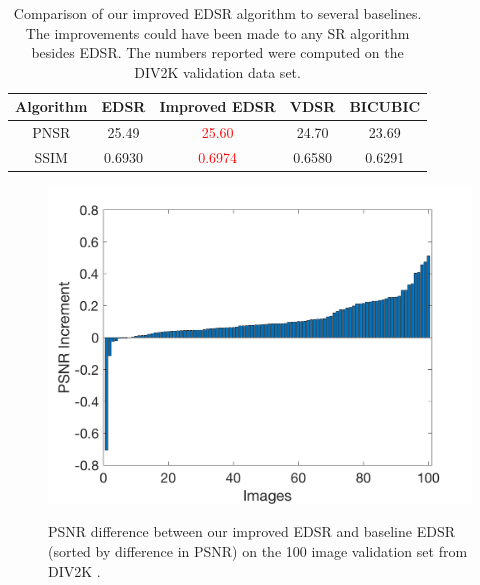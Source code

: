 \documentclass[10pt,twocolumn,letterpaper]{article}
\begin{document}
\begin{table}[ht!]
    \centering
    \begin{tabular}{c|c|c|c|c}
       \footnotesize{Algorithm}  & \footnotesize{EDSR} & \footnotesize{Improved} \footnotesize{EDSR} & \footnotesize{VDSR} & \footnotesize{BICUBIC}\\ \hline
        \footnotesize{PNSR} & 25.49 & \textcolor{red}{25.60} & 24.70 & 23.69 \\
        \footnotesize{SSIM} & 0.6930 & \textcolor{red}{0.6974} & 0.6580 & 0.6291\\
    \end{tabular}
    \caption{Comparison of our improved EDSR algorithm to several baselines. The improvements could have been made to any SR algorithm besides EDSR. The numbers reported were computed on the DIV2K validation data set.}
    \label{tbl:tricks}
\end{table}

\begin{figure}[htbp]
\centering
\includegraphics[width=\columnwidth]{Images/Track1DIFF.png}\\
\caption{PSNR difference between our improved EDSR and baseline EDSR (sorted by difference in PSNR) on the 100 image validation set from DIV2K \cite{Agustsson_2017_CVPR_Workshops}.}
\label{fig:track1diff}
\end{figure}
\end{document}
